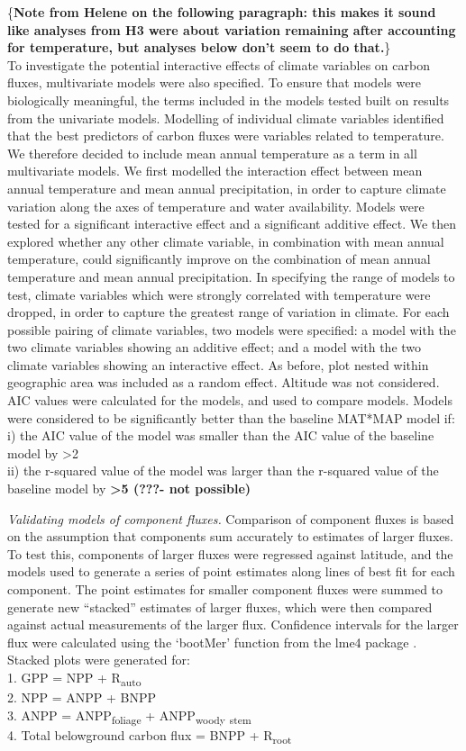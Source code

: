 \documentclass[]{article}
\begin{document}
\{\textbf{Note from Helene on the following paragraph: this makes it
sound like analyses from H3 were about variation remaining after
accounting for temperature, but analyses below don't seem to do
that.}\}\\
To investigate the potential interactive effects of climate variables on
carbon fluxes, multivariate models were also specified. To ensure that
models were biologically meaningful, the terms included in the models
tested built on results from the univariate models. Modelling of
individual climate variables identified that the best predictors of
carbon fluxes were variables related to temperature. We therefore
decided to include mean annual temperature as a term in all multivariate
models. We first modelled the interaction effect between mean annual
temperature and mean annual precipitation, in order to capture climate
variation along the axes of temperature and water availability. Models
were tested for a significant interactive effect and a significant
additive effect. We then explored whether any other climate variable, in
combination with mean annual temperature, could significantly improve on
the combination of mean annual temperature and mean annual
precipitation. In specifying the range of models to test, climate
variables which were strongly correlated with temperature were dropped,
in order to capture the greatest range of variation in climate. For each
possible pairing of climate variables, two models were specified: a
model with the two climate variables showing an additive effect; and a
model with the two climate variables showing an interactive effect. As
before, plot nested within geographic area was included as a random
effect. Altitude was not considered. AIC values were calculated for the
models, and used to compare models. Models were considered to be
significantly better than the baseline MAT*MAP model if:\\
i) the AIC value of the model was smaller than the AIC value of the
baseline model by \textgreater{}2\\
ii) the r-squared value of the model was larger than the r-squared value
of the baseline model by \textbf{\textgreater{}5 (???- not possible)}

\emph{Validating models of component fluxes.} Comparison of component
fluxes is based on the assumption that components sum accurately to
estimates of larger fluxes. To test this, components of larger fluxes
were regressed against latitude, and the models used to generate a
series of point estimates along lines of best fit for each component.
The point estimates for smaller component fluxes were summed to generate
new ``stacked'' estimates of larger fluxes, which were then compared
against actual measurements of the larger flux. Confidence intervals for
the larger flux were calculated using the `bootMer' function from the
lme4 package \citep{bates_fitting_2015}. Stacked plots were generated
for:\\
1. GPP = NPP + R\textsubscript{auto}\\
2. NPP = ANPP + BNPP\\
3. ANPP = ANPP\textsubscript{foliage} + ANPP\textsubscript{woody}
\textsubscript{stem}\\
4. Total belowground carbon flux = BNPP + R\textsubscript{root}
\end{document}
